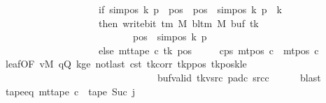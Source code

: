 \begin{isabellebody}
\ \ \ \ \ \ \ \ \ \ \ \ \ \ \ \ \ \ \ \ if\ sim{\isacharunderscore}{\kern0pt}pos\ {\isacharquery}{\kern0pt}k\ {\isacharquery}{\kern0pt}p\ {\isasymle}\ pos\ {\isasymand}\ pos\ {\isacharless}{\kern0pt}\ sim{\isacharunderscore}{\kern0pt}pos\ {\isacharquery}{\kern0pt}k\ {\isacharquery}{\kern0pt}p\ {\isacharplus}{\kern0pt}\ {\isacharquery}{\kern0pt}k\isanewline
\ \ \ \ \ \ \ \ \ \ \ \ \ \ \ \ \ \ \ \ then\ write{\isacharunderscore}{\kern0pt}bit\ {\isacharparenleft}{\kern0pt}{\isasymGamma}{\isacharunderscore}{\kern0pt}tm\ M{\isacharparenright}{\kern0pt}\ {\isacharparenleft}{\kern0pt}bl{\isacharunderscore}{\kern0pt}tm\ M{\isacharparenright}{\kern0pt}\ {\isacharparenleft}{\kern0pt}buf\ {\isacharquery}{\kern0pt}tk{\isacharparenright}{\kern0pt}\isanewline
\ \ \ \ \ \ \ \ \ \ \ \ \ \ \ \ \ \ \ \ \ \ \ \ \ \ \ {\isacharparenleft}{\kern0pt}pos\ {\isacharminus}{\kern0pt}\ sim{\isacharunderscore}{\kern0pt}pos\ {\isacharquery}{\kern0pt}k\ {\isacharquery}{\kern0pt}p{\isacharparenright}{\kern0pt}\isanewline
\ \ \ \ \ \ \ \ \ \ \ \ \ \ \ \ \ \ \ \ else\ mt{\isacharunderscore}{\kern0pt}tape\ c\ {\isacharquery}{\kern0pt}tk\ pos{\isacharparenright}{\kern0pt}{\isacharparenright}{\kern0pt}{\isacharparenright}{\kern0pt}{\isachardoublequoteclose}\isanewline
\ \ \ \ \ c{\isacharprime}{\kern0pt}{\isacharunderscore}{\kern0pt}ps{\isacharcolon}{\kern0pt}\ {\isachardoublequoteopen}mt{\isacharunderscore}{\kern0pt}pos\ c{\isacharprime}{\kern0pt}\ {\isacharequal}{\kern0pt}\ mt{\isacharunderscore}{\kern0pt}pos\ c{\isachardoublequoteclose}\isanewline
\ \ \ \ \isamarkupfalse%
\ leaf{\isacharbrackleft}{\kern0pt}OF\ vM\ qQ\ kge{}\ notlast\ c{\isacharunderscore}{\kern0pt}st\ tk{\isacharunderscore}{\kern0pt}corr\ tk{\isacharunderscore}{\kern0pt}ppos\ tk{\isacharunderscore}{\kern0pt}poskle\isanewline
\ \ \ \ \ \ \ \ \ \ \ \ \ \ \ \ \ \ \ \ \ \ \ \ \ \ \ \ \ \ \ \ buf{\isacharunderscore}{\kern0pt}valid\ tk{\isacharunderscore}{\kern0pt}vsrc\ pad{\isacharunderscore}{\kern0pt}c\ src{\isacharunderscore}{\kern0pt}c{\isacharbrackright}{\kern0pt}\isanewline
\ \ \ \ \isamarkupfalse%
\ blast\isanewline
\ \ %
\isanewline
\ \ \isamarkupfalse%
\ tape{\isacharunderscore}{\kern0pt}eq{\isacharcolon}{\kern0pt}\ {\isachardoublequoteopen}mt{\isacharunderscore}{\kern0pt}tape\ c{\isacharprime}{\kern0pt}\ {\isacharequal}{\kern0pt}\ {\isacharquery}{\kern0pt}tape\ {\isacharparenleft}{\kern0pt}Suc\ j{\isacharparenright}{\kern0pt}{\isachardoublequoteclose}\isanewline

\end{isabellebody}
